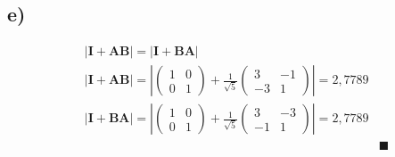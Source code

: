 \documentclass[fleqn]{article}
\begin{document}
\subsection*{e) }
\begin{align*}
	&\left|\mathbf{I+AB}\right|=\left|\mathbf{I+BA}\right|& \\
	&\left|\mathbf{I+AB}\right|=\left|
	\begin{pmatrix}
	1 & 0 \\
	0 & 1
	\end{pmatrix}+\frac{1}{\sqrt{5}}
	\begin{pmatrix}
	3 & -1 \\
	-3 & 1
	\end{pmatrix}\right|=2,7789& \\
	&\left|\mathbf{I+BA}\right|=\left|
	\begin{pmatrix}
	1 & 0 \\
	0 & 1
	\end{pmatrix}+\frac{1}{\sqrt{5}}
	\begin{pmatrix}
	3 & -3 \\
	-1 & 1
	\end{pmatrix}\right|=2,7789& \\
	&&\blacksquare
\end{align*}
\end{document}
